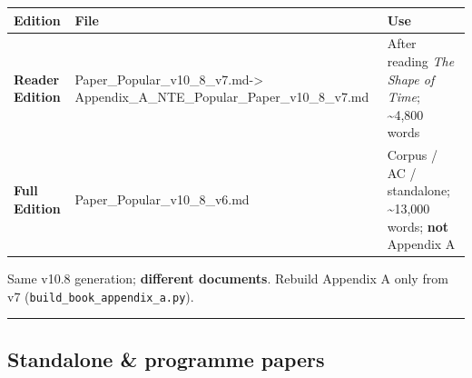 \documentclass[
  11pt,
]{article}
\newcounter{none} %
\begin{document}
{\def\LTcaptype{none} %
\begin{longtable}[]{@{}
  >{\raggedright\arraybackslash}p{}
  >{\raggedright\arraybackslash}p{}
  >{\raggedright\arraybackslash}p{}@{}}
\toprule\noalign{}
\begin{minipage}[b]{\linewidth}\raggedright
Edition
\end{minipage} & \begin{minipage}[b]{\linewidth}\raggedright
File
\end{minipage} & \begin{minipage}[b]{\linewidth}\raggedright
Use
\end{minipage} \\
\midrule\noalign{}
\endhead
\bottomrule\noalign{}
\endlastfoot
\textbf{Reader Edition} & Paper\_Popular\_v10\_8\_v7.md-\textgreater{}
Appendix\_A\_NTE\_Popular\_Paper\_v10\_8\_v7.md & After reading
\emph{The Shape of Time}; \textasciitilde4,800 words \\
\textbf{Full Edition} & Paper\_Popular\_v10\_8\_v6.md & Corpus / AC /
standalone; \textasciitilde13,000 words; \textbf{not} Appendix A \\
\end{longtable}
}

Same v10.8 generation; \textbf{different documents}. Rebuild Appendix A
only from v7 (\texttt{build\_book\_appendix\_a.py}).

\begin{center}\rule{0.5\linewidth}{0.5pt}\end{center}

\subsection{Standalone \& programme
papers}\label{standalone-programme-papers}
\end{document}
